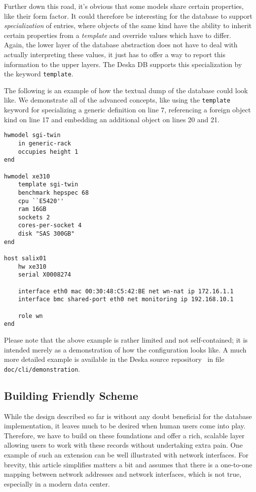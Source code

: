 \documentclass[a4paper]{jpconf}
\begin{document}
Further down this road, it's obvious that some models share certain properties, like their form factor.  It could therefore be
interesting for the database to support {\em specialization} of entries, where objects of the same kind have the ability to inherit
certain properties from a {\em template} and override values which have to differ.  Again, the lower layer of the database abstraction
does not have to deal with actually interpreting these values, it just has to offer a way to report this information to the upper
layers.  The Deska DB supports this specialization by the keyword {\tt template}.

The following is an example of how the textual dump of the database could look like.  We demonstrate all of the advanced concepts, like
using the {\tt template} keyword for specializing a generic definition on line 7, referencing a foreign object kind on line 17 and
embedding an additional object on lines 20 and 21.

\lstset{numbers=left}
\noindent\begin{minipage}{\textwidth}
\begin{lstlisting}
hwmodel sgi-twin
    in generic-rack
    occupies height 1
end

hwmodel xe310
    template sgi-twin
    benchmark hepspec 68
    cpu ``E5420''
    ram 16GB
    sockets 2
    cores-per-socket 4
    disk "SAS 300GB"
end

host salix01
    hw xe310
    serial X0008274

    interface eth0 mac 00:30:48:C5:42:BE net wn-nat ip 172.16.1.1
    interface bmc shared-port eth0 net monitoring ip 192.168.10.1

    role wn
end
\end{lstlisting}
\end{minipage}

Please note that the above example is rather limited and not self-contained; it is intended merely as a demonstration of how the
configuration looks like.  A much more detailed example is available in the Deska source repository~\cite{deska-project} in file {\tt
doc/cli/demonstration}.

\subsection{Building Friendly Scheme}

While the design described so far is without any doubt beneficial for the database implementation, it leaves much to be desired when
human users come into play.  Therefore, we have to build on these foundations and offer a rich, scalable layer allowing users to work
with these records without undertaking extra pain.  One example of such an extension can be well illustrated with network interfaces.
For brevity, this article simplifies matters a bit and assumes that there is a one-to-one mapping between network addresses and network
interfaces, which is not true, especially in a modern data center.
\end{document}
